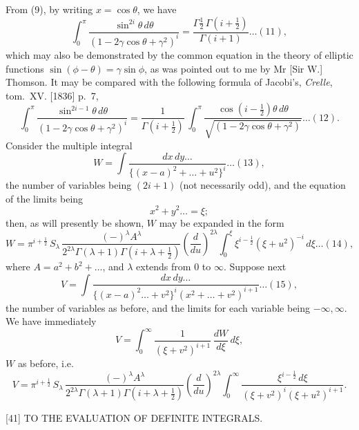 \documentclass[11pt]{article}
\begin{document}
From (9), by writing $x = \cos\theta$, we have
\[
  \int_{0}^{\pi}\!\frac{\sin^{2i}\theta\,d\theta}{(1 - 2\gamma\cos\theta + \gamma^{2})^{i}} = \frac{\Gamma\tfrac{1}{2}\,\Gamma(i+\tfrac{1}{2})}{\Gamma(i+1)}\dots(11),
\]
which may also be demonstrated by the common equation in the theory of elliptic functions $\sin(\phi - \theta) = \gamma\sin\phi$, as was pointed out to me by Mr [Sir W.] Thomson. It may be compared with the following formula of Jacobi's, \textit{Crelle}, tom.~XV. [1836] p.~7,
\[
  \int_{0}^{\pi}\!\frac{\sin^{2i-1}\theta\,d\theta}{(1 - 2\gamma\cos\theta + \gamma^{2})^{i}}
     = \frac{1}{\Gamma(i+\tfrac{1}{2})}\,\int_{0}^{\pi}\!\frac{\cos(i-\tfrac{1}{2})\theta\,d\theta}{\sqrt{(1 - 2\gamma\cos\theta + \gamma^{2})}}\dots(12).
\]
Consider the multiple integral
\[
  W = \int\!\frac{dx\,dy\dots}{\{(x-a)^{2} + \dots + u^{2}\}^{i}}\dots(13),
\]
the number of variables being $(2i+1)$ (not necessarily odd), and the equation of the limits being
\[
  x^{2} + y^{2}\dots = \xi;
\]
then, as will presently be shown, $W$ may be expanded in the form
\[
  W = \pi^{i+\tfrac{1}{2}}\,S_\lambda\,\frac{(-)^{\lambda}A^{\lambda}}{2^{2\lambda}\Gamma(\lambda+1)\Gamma(i+\lambda+\tfrac{1}{2})}\!\left(\frac{d}{du}\right)^{\!2\lambda}\!\int_{0}^{\xi}\!\xi^{i-\tfrac{1}{2}}(\xi+u^{2})^{-i}\,d\xi\dots(14),
\]
where $A = a^{2} + b^{2} + \dots$, and $\lambda$ extends from $0$ to $\infty$. Suppose next
\[
  V = \int\!\frac{dx\,dy\dots}{\{(x-a)^{2}\dots + v^{2}\}^{i}(x^{2}+\dots+v^{2})^{i+1}}\dots(15),
\]
the number of variables as before, and the limits for each variable being $-\infty,\infty$. We have immediately
\[
  V = \int_{0}^{\infty}\!\frac{1}{(\xi+v^{2})^{i+1}}\,\frac{dW}{d\xi}\,d\xi,
\]
$W$ as before, i.e.
\[
  V = \pi^{i+\tfrac{1}{2}}\,S_\lambda\,\frac{(-)^{\lambda}A^{\lambda}}{2^{2\lambda}\Gamma(\lambda+1)\Gamma(i+\lambda+\tfrac{1}{2})}\!\left(\frac{d}{du}\right)^{\!2\lambda}\!\int_{0}^{\infty}\!\frac{\xi^{i-\tfrac{1}{2}}\,d\xi}{(\xi+v^{2})^{i}(\xi+u^{2})^{i+1}}.
\]

\vspace{2em}

\begin{center}\small [41] \quad TO THE EVALUATION OF DEFINITE INTEGRALS. \end{center}
\end{document}
